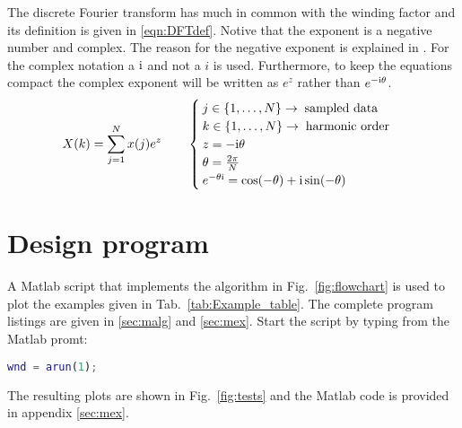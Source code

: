 The discrete Fourier transform has much in common with the winding factor and its definition is given in \eqref{eqn:DFTdef}. Notive that the exponent is a negative number and complex. The reason for the negative exponent is explained in \cite{REF-01048,REF-01049,REF-01050}. For the complex notation a ${\mathrm{i}}$ and not a $i$ is used. Furthermore, to keep the equations compact the complex exponent will be written as $e^z$ rather than $e^{-{\mathrm{i}}\theta}$.
\begin{equation}\label{eqn:DFTdef}
  X(k)=\sum_{j=1}^{N}x(j)e^z
  \qquad
  \begin{cases}
    j \in \left\{1,\ldots,N  \right\} \rightarrow \; \mbox{sampled data}\\
  	k \in \left\{1,\ldots,N  \right\} \rightarrow \; \mbox{harmonic order}\\
    z = -{\mathrm{i}}\theta   \\
  	\theta = \frac{2\pi}{N}   \\
  	e^{-\theta {\mathrm{i}}} = \cos (-\theta) + {\mathrm{i}} \sin (-\theta)
  \end{cases}
\end{equation}

\section{Design program}
A Matlab script that implements the algorithm in Fig.~\ref{fig:flowchart} is used to plot the examples given in Tab.~\ref{tab:Example_table}. The complete program listings are given in \ref{sec:malg} and \ref{sec:mex}. Start the script by typing from the Matlab promt:

\begin{lstlisting}[language=matlab]
wnd = arun(1);
\end{lstlisting}
The resulting plots are shown in Fig.~\ref{fig:tests} and the Matlab code is provided in appendix \ref{sec:mex}.

